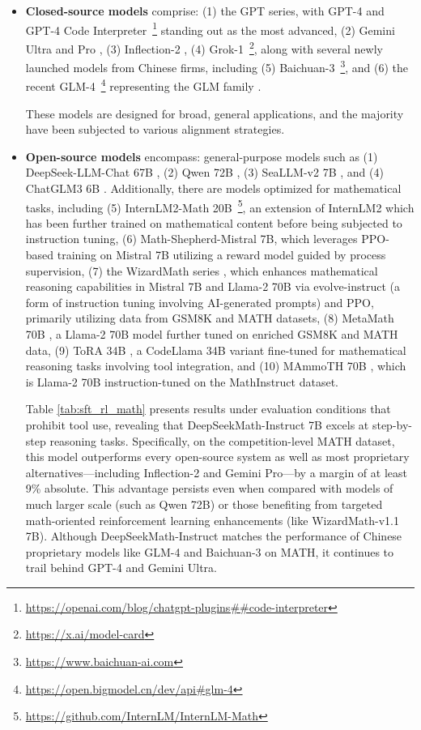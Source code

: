 \begin{itemize}[topsep=0pt]
\begin{itemize}[topsep=0pt]
    \item \textbf{Closed-source models} comprise: (1) the GPT series, with GPT-4 \citep{gpt4} and GPT-4 Code Interpreter~\footnote{\url{https://openai.com/blog/chatgpt-plugins\#\#code-interpreter}} standing out as the most advanced, (2) Gemini Ultra and Pro \citep{gemini}, (3) Inflection-2 \citep{inflection-2}, (4) Grok-1~\footnote{\url{https://x.ai/model-card}}, along with several newly launched models from Chinese firms, including (5) Baichuan-3~\footnote{\url{https://www.baichuan-ai.com}}, and (6) the recent GLM-4~\footnote{\url{https://open.bigmodel.cn/dev/api\#glm-4}} representing the GLM family \citep{glm}.

These models are designed for broad, general applications, and the majority have been subjected to various alignment strategies. 
\item \textbf{Open-source models} encompass: general-purpose models such as (1) DeepSeek-LLM-Chat 67B \citep{deepseek-llm}, (2) Qwen 72B \citep{qwen}, (3) SeaLLM-v2 7B \citep{seallm}, and (4) ChatGLM3 6B \citep{chatglm3}. Additionally, there are models optimized for mathematical tasks, including (5) InternLM2-Math 20B~\footnote{\url{https://github.com/InternLM/InternLM-Math}}, an extension of InternLM2 which has been further trained on mathematical content before being subjected to instruction tuning, (6) Math-Shepherd-Mistral 7B, which leverages PPO-based training \citep{schulman2017proximal} on Mistral 7B \citep{mistral} utilizing a reward model guided by process supervision, (7) the WizardMath series \citep{wizardmath}, which enhances mathematical reasoning capabilities in Mistral 7B and Llama-2 70B \citep{llama2} via evolve-instruct (a form of instruction tuning involving AI-generated prompts) and PPO, primarily utilizing data from GSM8K and MATH datasets, (8) MetaMath 70B \citep{metamath}, a Llama-2 70B model further tuned on enriched GSM8K and MATH data, (9) ToRA 34B \cite{tora}, a CodeLlama 34B variant fine-tuned for mathematical reasoning tasks involving tool integration, and (10) MAmmoTH 70B \citep{MathInstruct}, which is Llama-2 70B instruction-tuned on the MathInstruct dataset.

Table \ref{tab:sft_rl_math} presents results under evaluation conditions that prohibit tool use, revealing that DeepSeekMath-Instruct 7B excels at step-by-step reasoning tasks. Specifically, on the competition-level MATH dataset, this model outperforms every open-source system as well as most proprietary alternatives—including Inflection-2 and Gemini Pro—by a margin of at least 9\% absolute. This advantage persists even when compared with models of much larger scale (such as Qwen 72B) or those benefiting from targeted math-oriented reinforcement learning enhancements (like WizardMath-v1.1 7B). Although DeepSeekMath-Instruct matches the performance of Chinese proprietary models like GLM-4 and Baichuan-3 on MATH, it continues to trail behind GPT-4 and Gemini Ultra.


\end{itemize}
\end{itemize}
